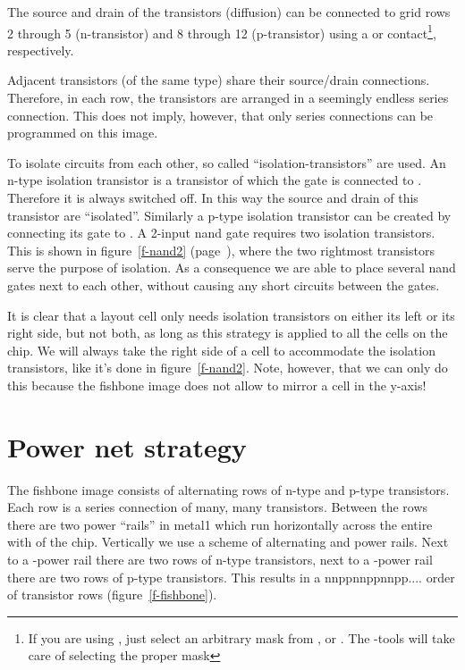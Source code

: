 The source and drain of the transistors (diffusion) can be connected to grid
rows 2 through 5 (n-transistor) and 8 through 12 (p-transistor)
using a  or  contact\footnote{If you are using
, just select an arbitrary mask from ,  or
. The -tools will take care of selecting the proper mask}, respectively.

Adjacent transistors (of the same type) share their source/drain connections.
Therefore, in each row, the transistors are arranged in a seemingly endless
series connection.  This does not imply, however, that only series connections
can be programmed on this image.

To isolate circuits from each other, so called ``isolation-transistors'' 
are
used.  An n-type isolation transistor is a transistor of which the gate is
connected to .  Therefore it is always switched off.  In this way the
source and drain of this transistor are ``isolated''.  
Similarly a p-type
isolation transistor can be created by connecting its gate to .  A
2-input {\sc nand} gate requires two isolation transistors. This is shown in
figure~\ref{f-nand2} (page~\pageref{f-nand2}), where the two rightmost
transistors serve the purpose of isolation. As a consequence we are able to
place several {\sc nand} gates next to each other, without causing any short
circuits between the gates.

It is clear that a layout cell only needs isolation transistors on either its
left or its right side, but not both, as long as this strategy is applied to
all the cells on the chip. We will always take the right side of a cell to
accommodate the isolation transistors, like it's done in figure~\ref{f-nand2}.
Note, however, that we can only do this because the fishbone image does not
allow to mirror a cell in the y-axis!

\section{Power net strategy}
The fishbone image consists of alternating rows of n-type and p-type
transistors. Each row is a series connection of many, many transistors.
Between the rows there are two power ``rails'' in metal1 which run horizontally
across the entire with of the chip.  Vertically we use a scheme of alternating
 and  power rails.  Next to a -power rail there are
two rows of n-type transistors, next to a -power rail there are two
rows of p-type transistors.  This results in a nnppnnppnnpp.... order of
transistor rows (figure~\ref{f-fishbone}).

